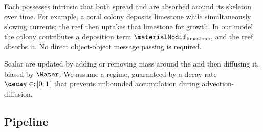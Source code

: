 Each  possesses intrinsic  that both spread and are absorbed around its skeleton over time. For example, a coral colony deposits limestone while simultaneously slowing currents; the reef then uptakes that limestone for growth.
In our model the colony contributes a deposition term $\materialModif_{\text{limestone}}$, and the reef absorbs it. No direct object-object message passing is required.

Scalar  are updated by adding or removing mass around the  and then diffusing it, biased by $\Water$.
We assume a  regime, guaranteed by a decay rate~$\decay \in;]0; 1[$ that prevents unbounded accumulation during advection-diffusion.

\subsection{Pipeline}

